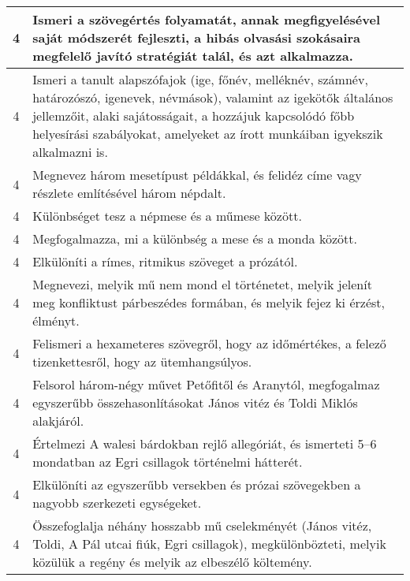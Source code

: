\begin{longtable}{c | p{} }
                                
                                          4 &  Ismeri a szövegértés folyamatát, annak megfigyelésével saját módszerét fejleszti, a hibás olvasási szokásaira megfelelő javító stratégiát talál, és azt alkalmazza. \\ \hline
                                          4 &  Ismeri a tanult alapszófajok (ige, főnév, melléknév, számnév, határozószó, igenevek, névmások), valamint az igekötők általános jellemzőit, alaki sajátosságait, a hozzájuk kapcsolódó főbb helyesírási szabályokat, amelyeket az írott munkáiban igyekszik alkalmazni is. \\ \hline
                                          4 &  Megnevez három mesetípust példákkal, és felidéz címe vagy részlete említésével három népdalt. \\ \hline
                                          4 &  Különbséget tesz a népmese és a műmese között. \\ \hline
                                          4 &  Megfogalmazza, mi a különbség a mese és a monda között. \\ \hline
                                          4 &  Elkülöníti a rímes, ritmikus szöveget a prózától. \\ \hline
                                          4 &  Megnevezi, melyik mű nem mond el történetet, melyik jelenít meg konfliktust párbeszédes formában, és melyik fejez ki érzést, élményt. \\ \hline
                                          4 &  Felismeri a hexameteres szövegről, hogy az időmértékes, a felező tizenkettesről, hogy az ütemhangsúlyos. \\ \hline
                                          4 &  Felsorol három-négy művet Petőfitől és Aranytól, megfogalmaz egyszerűbb  összehasonlításokat János vitéz és Toldi Miklós alakjáról. \\ \hline
                                          4 &  Értelmezi A walesi bárdokban rejlő allegóriát, és ismerteti 5–6 mondatban az Egri csillagok történelmi hátterét. \\ \hline
                                          4 &  Elkülöníti az egyszerűbb versekben és prózai szövegekben a nagyobb szerkezeti egységeket. \\ \hline
                                          4 &  Összefoglalja néhány hosszabb mű cselekményét (János vitéz, Toldi, A Pál utcai fiúk, Egri csillagok), megkülönbözteti, melyik közülük a regény és melyik az elbeszélő költemény. \\ \hline

\end{longtable}
